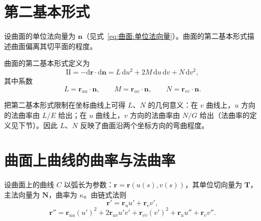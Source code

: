 
\section{第二基本形式}

设曲面的单位法向量为 $\mathbf{n}$（见式~\eqref{eq:曲面:单位法向量}）。曲面的第二基本形式描述曲面偏离其切平面的程度。

\begin{definition}[第二基本形式]
	曲面的第二基本形式定义为
	\begin{equation}
		\mathrm{II}=-\mathrm{d}\boldsymbol{r}\cdot\mathrm{d}\mathbf{n}
		=L\,\mathrm{d}u^{2}+2M\,\mathrm{d}u\,\mathrm{d}v+N\,\mathrm{d}v^{2},
		\label{eq:第二基本形式:定义}
	\end{equation}
	其中系数
	\begin{equation}
		L=\boldsymbol{r}_{uu}\cdot\mathbf{n},\qquad
		M=\boldsymbol{r}_{uv}\cdot\mathbf{n},\qquad
		N=\boldsymbol{r}_{vv}\cdot\mathbf{n}.
		\label{eq:第二基本形式:系数}
	\end{equation}
\end{definition}

\begin{remark}[几何意义]
	把第二基本形式限制在坐标曲线上可得 $L$、$N$ 的几何意义：在 $v$ 曲线上，$u$ 方向的法曲率由 $L/E$ 给出；在 $u$ 曲线上，$v$ 方向的法曲率由 $N/G$ 给出（法曲率的定义见下节）。因此 $L$、$N$ 反映了曲面沿两个坐标方向的弯曲程度。
\end{remark}

\section{曲面上曲线的曲率与法曲率}

设曲面上的曲线 $C$ 以弧长为参数：$\boldsymbol{r}=\boldsymbol{r}(u(s),v(s))$，其单位切向量为 $\mathbf{T}$，主法向量为 $\mathbf{N}$，曲率为 $\kappa$。由链式法则
\begin{equation}
	\boldsymbol{r}'=\boldsymbol{r}_u u'+\boldsymbol{r}_v v',
	\label{eq:曲面上曲线:切向量}
\end{equation}
\begin{equation}
	\boldsymbol{r}''=\boldsymbol{r}_{uu}(u')^{2}+2\boldsymbol{r}_{uv}u'v'+\boldsymbol{r}_{vv}(v')^{2}+\boldsymbol{r}_u u''+\boldsymbol{r}_v v''.
	\label{eq:曲面上曲线:二阶导数}
\end{equation}

